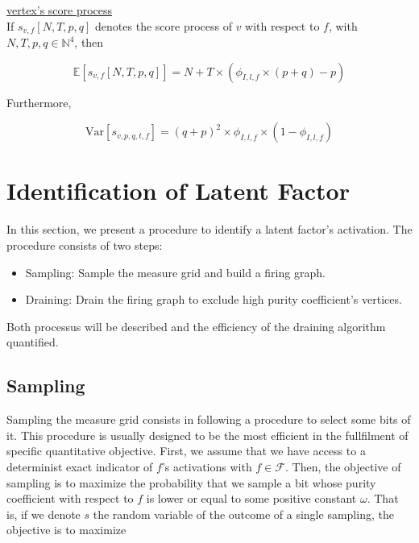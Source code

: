 \documentclass[a4paper, 11pt]{article}
\newcommand{\Var}{\mathrm{Var}}
\begin{document}
\underline{vertex's score process}\\

If $s_{v, f}[N, T, p, q]$ denotes the score process of $v$ with respect to $f$, with $N, T, p, q \in \mathbb{N}^4$, then

\begin{equation}
\label{prop:score_mean}
\mathbb{E} \left[ s_{v, f}[N, T, p, q]  \right] = N + T \times (\phi_{I, l, f} \times (p + q) - p)
\end{equation}

Furthermore,

\begin{equation}
\label{prop:score_var}
\Var \left[ s_{v, p, q, t, f}  \right] = (q + p)^{2} \times \phi_{I, l, f} \times (1 - \phi_{I, l, f})
\end{equation}

\section{Identification of Latent Factor}
In this section, we present a procedure to identify a latent factor's activation. The procedure consists of two steps:

\begin{itemize}
\item Sampling: Sample the measure grid and build a firing graph.
\item Draining: Drain the firing graph to exclude high purity coefficient's vertices.
\end{itemize}

Both processus will be described and the efficiency of the draining algorithm quantified.

\subsection{Sampling}


Sampling the measure grid consists in following a procedure to select some bits of it. This procedure is usually designed to be the most efficient in the fullfilment of specific quantitative objective. First, we assume that we have access to a determinist exact indicator of $f$'s activations with $f\in \mathcal{F}$. Then, the objective of sampling is to maximize the probability that we sample a bit whose purity coefficient with respect to $f$ is lower or equal to some positive constant $\omega$. That is, if we denote $s$ the random variable of the outcome of a single sampling, the objective is to maximize
\end{document}
